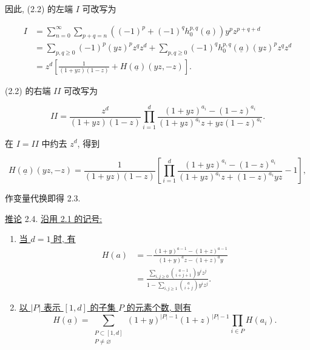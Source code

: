 因此, (2.2) 的左端 $I$ 可改写为

\begin{align*}
I
&=\sum_{n=0}^{\infty}\sum_{p+q=n}
\left((-1)^p+(-1)^q h_0^{p,q}(\underline a)\right)y^pz^{p+q+d}\\
&=\sum_{p,q\geq0}(-1)^p(yz)^pz^qz^d
+\sum_{p,q\geq0}(-1)^q h_0^{p,q}(\underline a)(yz)^pz^qz^d\\
&=z^d\left[\frac{1}{(1+yz)(1-z)}
+H(\underline a)(yz,-z)\right].
\end{align*}

(2.2) 的右端 $II$ 可改写为

\begin{equation*}
II=\frac{z^d}{(1+yz)(1-z)}
\prod_{i=1}^d
\frac{(1+yz)^{a_i}-(1-z)^{a_i}}
{(1+yz)^{a_i}z+yz(1-z)^{a_i}}.
\end{equation*}

在 $I=II$ 中约去 $z^d$, 得到

\begin{equation*}
H(\underline a)(yz,-z)
=\frac{1}{(1+yz)(1-z)}\left[
\prod_{i=1}^d
\frac{(1+yz)^{a_i}-(1-z)^{a_i}}
{(1+yz)^{a_i}z+(1-z)^{a_i}yz}-1\right],
\end{equation*}

作变量代换即得 2.3.


\underline{推论} 2.4. \underline{沿用 2.1 的记号:}

\begin{enumerate}[label=(\roman*),leftmargin=2.6em]
\item \underline{当 $d=1$ 时, 有}
\begin{equation*}
\begin{aligned}
H(a)
&=-\frac{(1+y)^{a-1}-(1+z)^{a-1}}
{(1+y)^az-(1+z)^ay}\\[1ex]
&=\frac{\displaystyle\sum_{i,j\geq0}
\binom{a-1}{i+j+1}y^iz^j}
{\displaystyle1-\sum_{i,j\geq1}\binom{a}{i+j}y^iz^j}.
\end{aligned}
\end{equation*}

\item \underline{以 $|P|$ 表示 $[1,d]$ 的子集 $P$ 的元素个数, 则有}
\begin{equation*}
H(\underline a)=
\sum_{\substack{P\subset[1,d]\\P\ne\varnothing}}
(1+y)^{|P|-1}(1+z)^{|P|-1}
\prod_{i\in P}H(a_i).
\end{equation*}
\end{enumerate}

